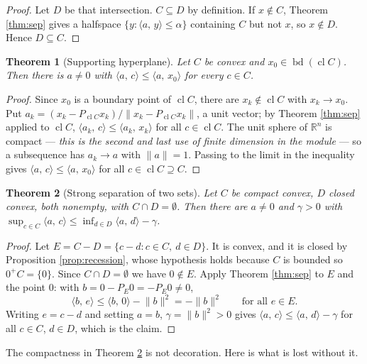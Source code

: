 \documentclass[11pt,a4paper]{article}
\theoremstyle{definition}
\theoremstyle{plain}
\newtheorem{theorem}{Theorem}
\theoremstyle{remark}
\newcommand{\R}{\mathbb{R}}
\newcommand{\ip}[2]{\langle #1,\, #2\rangle}
\newcommand{\norm}[1]{\lVert #1\rVert}
\newcommand{\proj}{P}
\DeclareMathOperator{\cl}{cl}
\DeclareMathOperator{\bd}{bd}
\begin{document}
\begin{proof}
Let $D$ be that intersection. $C\subseteq D$ by definition. If $x\notin C$, Theorem
\ref{thm:sep} gives a halfspace $\{y:\ip{a}{y}\le\alpha\}$ containing $C$ but not $x$, so
$x\notin D$. Hence $D\subseteq C$.
\end{proof}

\begin{theorem}[Supporting hyperplane]
\label{thm:support}
Let $C$ be convex and $x_0\in\bd(\cl C)$. Then there is $a\ne0$ with
$\ip{a}{c}\le\ip{a}{x_0}$ for every $c\in C$.
\end{theorem}

\begin{proof}
Since $x_0$ is a boundary point of $\cl C$, there are $x_k\notin\cl C$ with $x_k\to x_0$. Put
$a_k=(x_k-\proj_{\cl C}x_k)/\norm{x_k-\proj_{\cl C}x_k}$, a unit vector; by Theorem
\ref{thm:sep} applied to $\cl C$, $\ip{a_k}{c}\le\ip{a_k}{x_k}$ for all $c\in\cl C$. The unit
sphere of $\R^n$ is compact --- \emph{this is the second and last use of finite dimension in
the module} --- so a subsequence has $a_k\to a$ with $\norm a=1$. Passing to the limit in the
inequality gives $\ip{a}{c}\le\ip{a}{x_0}$ for all $c\in\cl C\supseteq C$.
\end{proof}

\begin{theorem}[Strong separation of two sets]
\label{thm:septwo}
Let $C$ be compact convex, $D$ closed convex, both nonempty, with $C\cap D=\emptyset$. Then
there are $a\ne0$ and $\gamma>0$ with
$\sup_{c\in C}\ip{a}{c}\le\inf_{d\in D}\ip{a}{d}-\gamma$.
\end{theorem}

\begin{proof}
Let $E=C-D=\{c-d:c\in C,\ d\in D\}$. It is convex, and it is closed by Proposition
\ref{prop:recession}, whose hypothesis holds because $C$ is bounded so $0^+C=\{0\}$. Since
$C\cap D=\emptyset$ we have $0\notin E$. Apply Theorem \ref{thm:sep} to $E$ and the point $0$:
with $b=0-\proj_E0=-\proj_E0\ne0$,
\[
\ip{b}{e}\le\ip{b}{0}-\norm b^2=-\norm b^2\qquad\text{for all }e\in E .
\]
Writing $e=c-d$ and setting $a=b$, $\gamma=\norm b^2>0$ gives
$\ip{a}{c}\le\ip{a}{d}-\gamma$ for all $c\in C$, $d\in D$, which is the claim.
\end{proof}

The compactness in Theorem \ref{thm:septwo} is not decoration. Here is what is lost without it.
\end{document}
